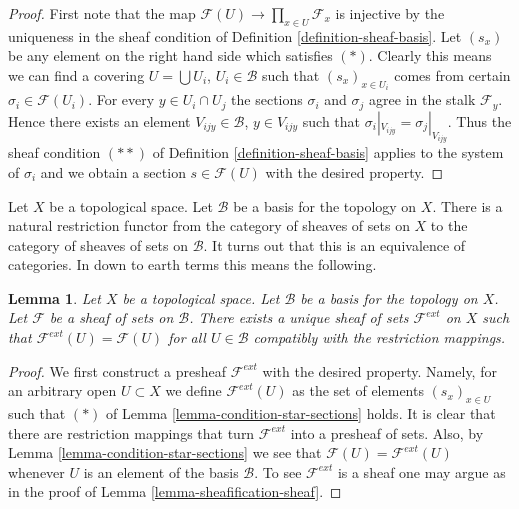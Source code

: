 \documentclass{stacks-project}
\theoremstyle{plain}
\newtheorem{lemma}[subsection]{Lemma}
\theoremstyle{definition}
\theoremstyle{remark}
\numberwithin{equation}{subsection}
\begin{document}
\begin{proof}
First note that the map
$\mathcal{F}(U) \to \prod\nolimits_{x \in U} \mathcal{F}_x$
is injective by the uniqueness in the sheaf condition
of Definition \ref{definition-sheaf-basis}. Let $(s_x)$ be
any element on the right hand side which satisfies $(*)$.
Clearly this means we can find a covering $U = \bigcup U_i$,
$U_i \in \mathcal{B}$ such that $(s_x)_{x \in U_i}$ comes from
certain $\sigma_i \in \mathcal{F}(U_i)$. For every $y \in U_i \cap U_j$
the sections $\sigma_i$ and $\sigma_j$ agree in the stalk
$\mathcal{F}_y$. Hence there exists an element $V_{ijy} \in \mathcal{B}$,
$y \in V_{ijy}$ such that $\sigma_i|_{V_{ijy}} = \sigma_j|_{V_{ijy}}$.
Thus the sheaf condition $(**)$ of Definition \ref{definition-sheaf-basis}
applies to the system of $\sigma_i$ and we obtain a section
$s \in \mathcal{F}(U)$ with the desired property.
\end{proof}

\noindent
Let $X$ be a topological space.
Let $\mathcal{B}$ be a basis for the topology on $X$.
There is a natural restriction functor from the category
of sheaves of sets on $X$ to the category of sheaves of
sets on $\mathcal{B}$. It turns out that this is an equivalence
of categories. In down to earth terms this means the following.

\begin{lemma}
\label{lemma-extend-off-basis}
Let $X$ be a topological space.
Let $\mathcal{B}$ be a basis for the topology on $X$.
Let $\mathcal{F}$ be a sheaf of sets on $\mathcal{B}$.
There exists a unique sheaf of sets $\mathcal{F}^{ext}$
on $X$ such that $\mathcal{F}^{ext}(U) = \mathcal{F}(U)$
for all $U \in \mathcal{B}$ compatibly with the restriction
mappings.
\end{lemma}

\begin{proof}
We first construct a presheaf $\mathcal{F}^{ext}$ with the
desired property. Namely, for an arbitrary open $U \subset X$ we
define $\mathcal{F}^{ext}(U)$ as the set of elements
$(s_x)_{x \in U}$ such that $(*)$ of
Lemma \ref{lemma-condition-star-sections} holds.
It is clear that there are restriction mappings
that turn $\mathcal{F}^{ext}$ into a presheaf of sets.
Also, by Lemma \ref{lemma-condition-star-sections} we
see that $\mathcal{F}(U) = \mathcal{F}^{ext}(U)$
whenever $U$ is an element of the basis $\mathcal{B}$.
To see $\mathcal{F}^{ext}$ is a sheaf one may
argue as in the proof of Lemma \ref{lemma-sheafification-sheaf}.
\end{proof}
\end{document}
